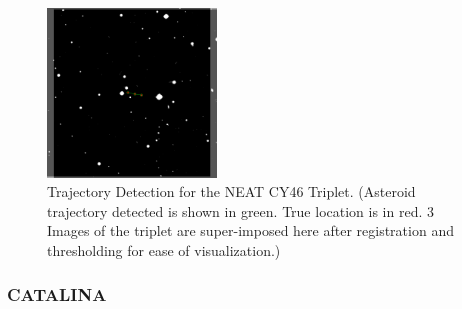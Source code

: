 

\begin{figure}[h]
\begin{center}
\includegraphics[width=0.4\textwidth]{Figures/NEATLines_LogicalImg.pdf}
\end{center}
\caption{Trajectory Detection for the NEAT CY46 Triplet. (Asteroid trajectory detected is shown in green. True location is in red. 3 Images of the triplet are super-imposed here after registration and thresholding for ease of visualization.)}
\label{fig:IPP_NEAT_Trajectory}
\end{figure}
\subsubsection{CATALINA}


